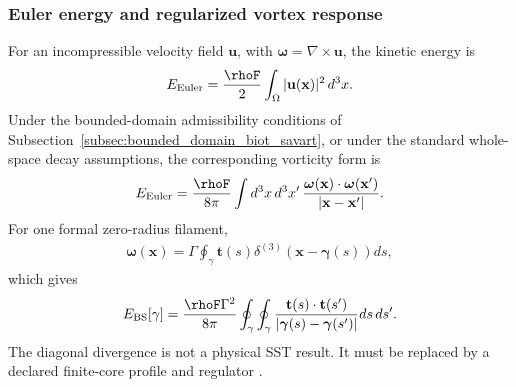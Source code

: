 \subsubsection{Euler energy and regularized vortex response}

For an incompressible velocity field \(\mathbf u\), with
\(\boldsymbol\omega=\nabla\times\mathbf u\), the kinetic energy is
\begin{align}
    E_{\rm Euler}
    =
    \frac{\rhoF}{2}
    \int_{\Omega}|\mathbf u(\mathbf x)|^2\,d^3x.
    \label{eq:rt_alpha_euler_energy_v0835}
\end{align}
Under the bounded-domain admissibility conditions of
Subsection~\ref{subsec:bounded_domain_biot_savart}, or under the standard
whole-space decay assumptions, the corresponding vorticity form is
\begin{align}
    E_{\rm Euler}
    =
    \frac{\rhoF}{8\pi}
    \int d^3x\,d^3x'\,
    \frac{
        \boldsymbol\omega(\mathbf x)\cdot
        \boldsymbol\omega(\mathbf x')
    }{
        |\mathbf x-\mathbf x'|
    }.
    \label{eq:rt_alpha_vorticity_energy_v0835}
\end{align}
For one formal zero-radius filament,
\begin{align}
    \boldsymbol\omega(\mathbf x)
    =
    \Gamma
    \oint_\gamma
    \mathbf t(s)
    \delta^{(3)}
    \!\left(\mathbf x-\boldsymbol\gamma(s)\right)ds,
\end{align}
which gives
\begin{align}
    E_{\rm BS}[\gamma]
    =
    \frac{\rhoF\Gamma^2}{8\pi}
    \oint_\gamma\oint_\gamma
    \frac{
        \mathbf t(s)\cdot\mathbf t(s')
    }{
        |\boldsymbol\gamma(s)-\boldsymbol\gamma(s')|
    }
    ds\,ds'.
    \label{eq:rt_alpha_filament_biot_savart_energy_v0835}
\end{align}
The diagonal divergence is not a physical SST result.  It must be replaced by
a declared finite-core profile and regulator
\cite{Saffman1992,HornNicolisPenco2015}.

